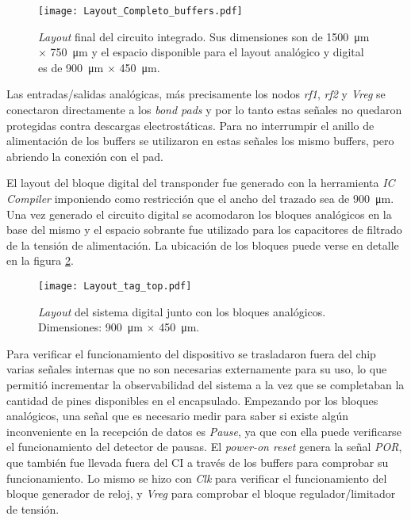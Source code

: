 \begin{figure}
	\centering
	\texttt{[image: Layout\_Completo\_buffers.pdf]}
	\caption{\emph{Layout} final del circuito integrado. Sus dimensiones 
	son de \SI{1500}{\micro\meter} \(\times\) \SI{750}{\micro\meter} y 
	el espacio disponible para el layout analógico y digital es de 
	\SI{900}{\micro\meter} \(\times\) \SI{450}{\micro\meter}.}
	\label{fig:LayoutCompleto}
\end{figure}

Las entradas/salidas analógicas, más precisamente los nodos 
\emph{rf1}, \emph{rf2} y \emph{Vreg} se conectaron directamente a los 
\emph{bond pads} y por lo tanto estas señales no quedaron protegidas 
contra descargas electrostáticas. Para no interrumpir el anillo de 
alimentación de los buffers se utilizaron en estas señales los mismo 
buffers, pero abriendo la conexión con el pad.

El layout del bloque digital del transponder fue generado con la 
herramienta \emph{IC Compiler} imponiendo como restricción que el 
ancho del trazado sea de \SI{900}{\micro\meter}. Una vez generado el 
circuito digital se acomodaron los bloques analógicos en la base del 
mismo y el espacio sobrante fue utilizado para los capacitores de 
filtrado de la tensión de alimentación. La ubicación de los bloques 
puede verse en detalle en la figura \ref{fig:LayoutTagTop}.

\begin{figure}
	\centering
	\texttt{[image: Layout\_tag\_top.pdf]}
	\caption{\emph{Layout} del sistema digital junto con los bloques 
	analógicos. Dimensiones: \SI{900}{\micro\meter} \(\times\) \SI{450}{\micro\meter}.}
	\label{fig:LayoutTagTop}
\end{figure}

Para verificar el funcionamiento del dispositivo se trasladaron 
fuera del chip varias señales internas que no son necesarias 
externamente para su uso, lo que permitió incrementar la 
observabilidad del sistema a la vez que se completaban la cantidad de 
pines disponibles en el encapsulado. Empezando por los bloques 
analógicos, una señal que es necesario medir para saber si existe algún 
inconveniente en la recepción de datos es \emph{Pause}, ya que con ella 
puede verificarse el funcionamiento del detector de pausas. El 
\emph{power-on reset} genera la señal \emph{POR}, que también fue 
llevada fuera del CI a través de los buffers para comprobar su 
funcionamiento. Lo mismo se hizo con \emph{Clk} para verificar el 
funcionamiento del bloque generador de reloj, y \emph{Vreg} para 
comprobar el bloque regulador/limitador de tensión. 

